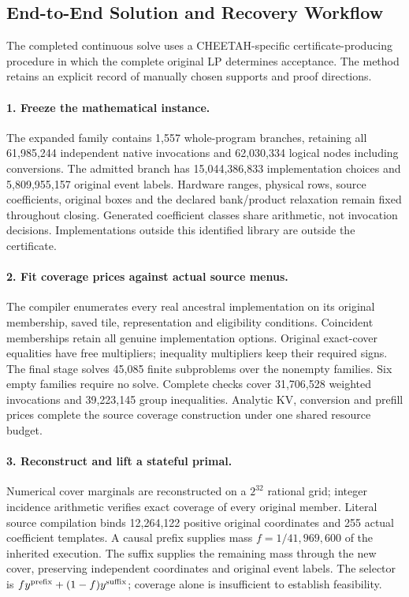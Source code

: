 \subsection{End-to-End Solution and Recovery Workflow}
\label{app:native_solve_workflow}
The completed continuous solve uses a CHEETAH-specific certificate-producing procedure in which the complete original LP determines acceptance.
The method retains an explicit record of manually chosen supports and proof directions.

\paragraph{1. Freeze the mathematical instance.}
The expanded family contains 1,557 whole-program branches, retaining all 61,985,244 independent native invocations and 62,030,334 logical nodes including conversions.
The admitted branch has 15,044,386,833 implementation choices and 5,809,955,157 original event labels.
Hardware ranges, physical rows, source coefficients, original boxes and the declared bank/product relaxation remain fixed throughout closing.
Generated coefficient classes share arithmetic, not invocation decisions.
Implementations outside this identified library are outside the certificate.

\paragraph{2. Fit coverage prices against actual source menus.}
The compiler enumerates every real ancestral implementation on its original membership, saved tile, representation and eligibility conditions.
Coincident memberships retain all genuine implementation options.
Original exact-cover equalities have free multipliers; inequality multipliers keep their required signs.
The final stage solves 45,085 finite subproblems over the nonempty families.
Six empty families require no solve.
Complete checks cover 31,706,528 weighted invocations and 39,223,145 group inequalities.
Analytic KV, conversion and prefill prices complete the source coverage construction under one shared resource budget.

\paragraph{3. Reconstruct and lift a stateful primal.}
Numerical cover marginals are reconstructed on a $2^{32}$ rational grid; integer incidence arithmetic verifies exact coverage of every original member.
Literal source compilation binds 12,264,122 positive original coordinates and 255 actual coefficient templates.
A causal prefix supplies mass $f=1/41{,}969{,}600$ of the inherited execution.
The suffix supplies the remaining mass through the new cover, preserving independent coordinates and original event labels.
The selector is $f y^{\rm prefix}+(1-f)y^{\rm suffix}$; coverage alone is insufficient to establish feasibility.

